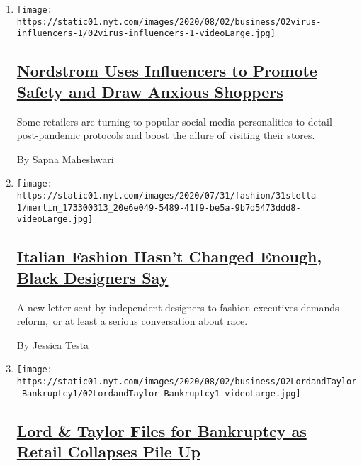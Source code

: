 \begin{enumerate}
\def\labelenumi{\arabic{enumi}.}
\item
  \texttt{[image: https://static01.nyt.com/images/2020/08/02/business/02virus-influencers-1/02virus-influencers-1-videoLarge.jpg]}

  \hypertarget{nordstrom-uses-influencers-to-promote-safety-and-draw-anxious-shoppers}{%
  \subsection{\texorpdfstring{\href{/2020/08/02/business/media/coronavirus-nordstrom-infuencers.html}{Nordstrom
  Uses Influencers to Promote Safety and Draw Anxious
  Shoppers}}{Nordstrom Uses Influencers to Promote Safety and Draw Anxious Shoppers}}\label{nordstrom-uses-influencers-to-promote-safety-and-draw-anxious-shoppers}}

  Some retailers are turning to popular social media personalities to
  detail post-pandemic protocols and boost the allure of visiting their
  stores.

  By Sapna Maheshwari
\item
  \texttt{[image: https://static01.nyt.com/images/2020/07/31/fashion/31stella-1/merlin\_173300313\_20e6e049-5489-41f9-be5a-9b7d5473ddd8-videoLarge.jpg]}

  \hypertarget{italian-fashion-hasnt-changed-enough-black-designers-say}{%
  \subsection{\texorpdfstring{\href{/2020/07/31/fashion/italian-fashion-black-designers.html}{Italian
  Fashion Hasn't Changed Enough, Black Designers
  Say}}{Italian Fashion Hasn't Changed Enough, Black Designers Say}}\label{italian-fashion-hasnt-changed-enough-black-designers-say}}

  A new letter sent by independent designers to fashion executives
  demands reform,~or at least a serious conversation about race.

  By Jessica Testa
\item
  \texttt{[image: https://static01.nyt.com/images/2020/08/02/business/02LordandTaylor-Bankruptcy1/02LordandTaylor-Bankruptcy1-videoLarge.jpg]}

  \hypertarget{lord--taylor-files-for-bankruptcy-as-retail-collapses-pile-up}{%
  \subsection{\texorpdfstring{\href{/2020/08/02/business/Lord-and-Taylor-Bankruptcy.html}{Lord
  \& Taylor Files for Bankruptcy as Retail Collapses Pile
  Up}}{Lord \& Taylor Files for Bankruptcy as Retail Collapses Pile Up}}\label{lord--taylor-files-for-bankruptcy-as-retail-collapses-pile-up}}


\end{enumerate}
